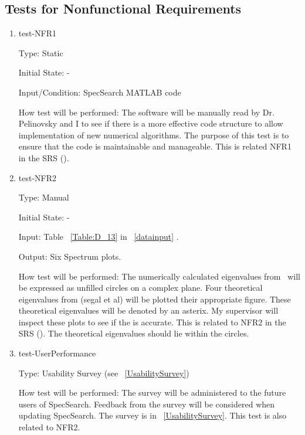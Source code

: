 \documentclass[12pt, titlepage]{article}
\begin{document}
\subsection{Tests for Nonfunctional Requirements}
\label{NFRtests}
\begin{enumerate}

\item{test-NFR1\\}

Type: Static
					
Initial State: -
					
Input/Condition: SpecSearch MATLAB code
					
How test will be performed: The software will be manually read by Dr. 
Pelinovsky and I to see if there is a more effective code structure to allow 
implementation of new numerical algorithms. The purpose of this test is to 
ensure that the code is maintainable and manageable. This is related NFR1 in 
the 
SRS (\cite{SRS}). 

\item{test-NFR2\\} 

Type: Manual 

Initial State: -

Input: Table ~\ref{Table:D_13} in ~\ref{datainput} .

Output: Six Spectrum plots.

How test will be performed: The numerically calculated eigenvalues from 
\progname \ will be expressed as unfilled circles on a complex plane. Four 
theoretical eigenvalues from (segal et al) will be plotted their appropriate 
figure. These theoretical eigenvalues will be denoted by an asterix. My 
supervisor will inspect these plots to see if the \progname is accurate. This 
is related to NFR2 in the SRS (\cite{SRS}). The theoretical eigenvalues should 
lie 
within the circles. \\ 

\item{test-UserPerformance\\} 

Type: Usability Survey (see ~\ref{UsabilitySurvey}) 

How test will be performed: The survey will be administered to the future users 
of SpecSearch. Feedback from the survey will be considered when updating 
SpecSearch. The survey is in ~\ref{UsabilitySurvey}. This test is also related 
to NFR2. 

\end{enumerate}
\end{document}

